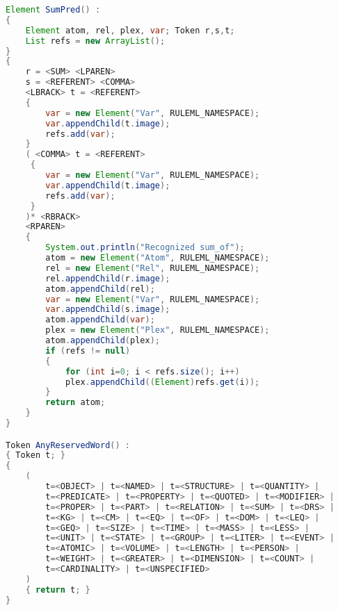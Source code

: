 \documentclass[12pt]{report}
\begin{document}
\begin{lstlisting}[language=java, showstringspaces=false, tabsize=2]
Element SumPred() :
{
	Element atom, rel, plex, var; Token r,s,t;
	List refs = new ArrayList();
}
{
	r = <SUM> <LPAREN>
	s = <REFERENT> <COMMA>
	<LBRACK> t = <REFERENT>
	{
		var = new Element("Var", RULEML_NAMESPACE);
		var.appendChild(t.image);
		refs.add(var);
	}
	( <COMMA> t = <REFERENT>
	 {
		var = new Element("Var", RULEML_NAMESPACE);
		var.appendChild(t.image);
		refs.add(var);
	 }  
	)* <RBRACK>
	<RPAREN>
	{
		System.out.println("Recognized sum_of");
		atom = new Element("Atom", RULEML_NAMESPACE);
		rel = new Element("Rel", RULEML_NAMESPACE);
		rel.appendChild(r.image);
		atom.appendChild(rel);
		var = new Element("Var", RULEML_NAMESPACE);
		var.appendChild(s.image);
		atom.appendChild(var);
		plex = new Element("Plex", RULEML_NAMESPACE);
		atom.appendChild(plex);
		if (refs != null)
		{
			for (int i=0; i < refs.size(); i++)
			plex.appendChild((Element)refs.get(i));
		}
		return atom;
	}
}

Token AnyReservedWord() :
{ Token t; }
{
	(
		t=<OBJECT> | t=<NAMED> | t=<STRUCTURE> | t=<QUANTITY> |
		t=<PREDICATE> |	t=<PROPERTY> | t=<QUOTED> | t=<MODIFIER> |
		t=<PROPER> | t=<PART> |	t=<RELATION> | t=<SUM> | t=<DRS> |
		t=<KG> | t=<CM> | t=<EQ> | t=<OF> | t=<DOM> | t=<LEQ> |
		t=<GEQ> | t=<SIZE> | t=<TIME> | t=<MASS> | t=<LESS> |
		t=<UNIT> | t=<STATE> | t=<GROUP> | t=<LITER> | t=<EVENT> |
		t=<ATOMIC> | t=<VOLUME> | t=<LENGTH> | t=<PERSON> |
		t=<WEIGHT> | t=<GREATER> | t=<DIMENSION> | t=<COUNT> |
		t=<CARDINALITY> | t=<UNSPECIFIED>
	)
	{ return t; }
}
\end{lstlisting}
\end{document}
